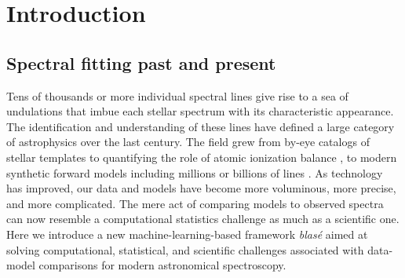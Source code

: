 \documentclass[trackchanges]{aastex631}
\begin{document}

\section{Introduction}\label{sec:intro}

\subsection{Spectral fitting past and present}

Tens of thousands or more individual spectral lines give rise to a sea of undulations that imbue each stellar spectrum with its characteristic appearance.  The identification and understanding of these lines have defined a large category of astrophysics over the last century.  The field grew from by-eye catalogs of stellar templates \citep{1901AnHar..28..129C} to quantifying the role of atomic ionization balance \citep{1925PhDT.........1P}, to modern synthetic forward models including millions or billions of lines \citep[\emph{e.g.}][]{husser13, 2021ApJ...920...85M, 2021JQSRT.26107476V}.  As technology has improved, our data and models have become more voluminous, more precise, and more complicated.  The mere act of comparing models to observed spectra can now resemble a computational statistics challenge as much as a scientific one.  Here we introduce a new machine-learning-based framework \emph{blas\'e} aimed at solving computational, statistical, and scientific challenges associated with data-model comparisons for modern astronomical spectroscopy.
\end{document}
